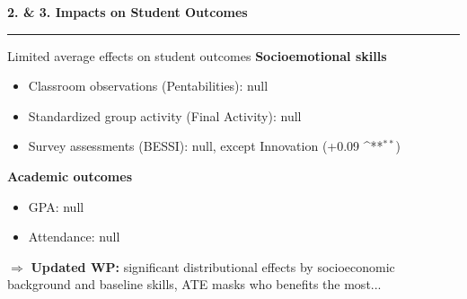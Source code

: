 \documentclass[xcolor=usenames,dvipsnames]{beamer}
\newcommand{\sym}[1]{\ifmmode^{#1}\else$^{#1}$\fi}
\begin{document}
\begin{frame}[plain]
\vspace{2.5cm}
{\large \textbf{2. \& 3. Impacts on Student Outcomes}}\\
{\color{HopBlue}\rule{0.4\linewidth}{2pt}}
\end{frame}


\begin{frame}{Limited average effects on student outcomes}
\small
\textcolor{HopBlue}{\textbf{Socioemotional skills}}
\begin{itemize}
\item Classroom observations (Pentabilities): null
\item Standardized group activity (Final Activity): null
\item Survey assessments (BESSI): null, except Innovation (+0.09 \sym{**})
\end{itemize}
\vspace{0.2cm}
\textcolor{HopBlue}{\textbf{Academic outcomes}}
\begin{itemize}
\item GPA: null
\item Attendance: null
\end{itemize}
\vspace{0.3cm}
{\textbf{$\Rightarrow$}} \textbf{Updated WP:} significant distributional effects by socioeconomic background and baseline skills, ATE masks who benefits the most...
\end{frame}
\end{document}
